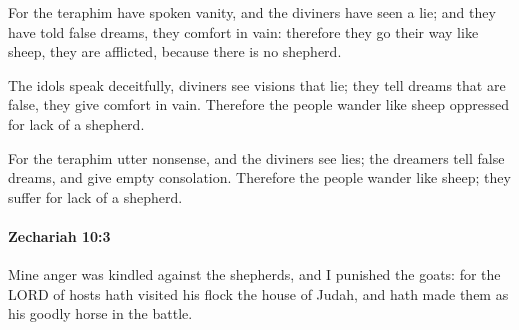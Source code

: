 			\begin{versebox}
					\item[BHS] 
					\item[LXX] 
					\item[ASV] For the teraphim have spoken vanity, and the diviners have seen a lie; and they have told false dreams, they comfort in vain: therefore they go their way like sheep, they are afflicted, because there is no shepherd.
					\item[NIV] The idols speak deceitfully, diviners see visions that lie; they tell dreams that are false, they give comfort in vain. Therefore the people wander like sheep oppressed for lack of a shepherd.
					\item[NRSV] For the teraphim utter nonsense, and the diviners see lies; the dreamers tell false dreams, and give empty consolation. Therefore the people wander like sheep; they suffer for lack of a shepherd.
			\end{versebox}

		\paragraph{Zechariah 10:3} %
			\label{ZECHARIAH-10-3}

			Mine anger was kindled against the shepherds, and I punished the goats: for the LORD of hosts hath visited his flock the house of Judah, and hath made them as his goodly horse in the battle.

